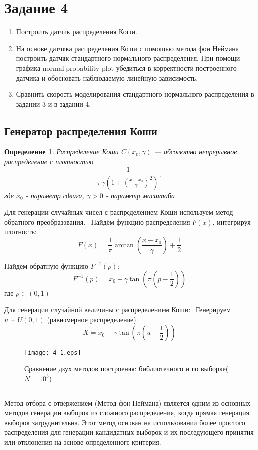 \documentclass[11pt]{article}
\newtheorem{definition}{Определение}[section]
\begin{document}
\section{Задание 4}


\begin{enumerate}
\item Построить датчик распределения Коши.
\item На основе датчика распределения Коши с помощью метода фон Неймана построить датчик стандартного нормального распределения. При помощи 
графика normal probability plot убедиться в корректности построенного датчика и обосновать наблюдаемую линейную зависимость.
\item Сравнить скорость моделирования стандартного нормального распределения в задании 3 и в задании 4.
\end{enumerate}

\subsection{Генератор распределения Коши}

\begin{definition}
Распределение Коши $C(x_0,\gamma)$ --- абсолютно непрерывное распределение с плотностью
$$
\dfrac{1}{\pi\gamma\left(1+(\frac{x-x_0}{\gamma})^2 \right)},
$$
где $x_0$ - параметр сдвига, $\gamma>0$ - параметр масштаба.
\end{definition}


Для генерации случайных чисел с распределением Коши используем метод обратного преобразования. \
Найдём функцию распределения $F(x)$, интегрируя плотность:
$$
    F(x) = \frac{1}{\pi}\arctan(\frac{x-x_0}{\gamma}) + \frac{1}{2}
$$

Найдём обратную функцию $F^{-1}(p)$:
$$
    F^{-1}(p) = x_0 + \gamma\tan(\pi(p-\frac{1}{2}))
$$
где $p \in (0,1)$

Для генерации случайной величины с распределением Коши: \
Генерируем $u \sim U(0,1)$ (равномерное распределение) 
$$
    X = x_0 + \gamma\tan(\pi(u-\frac{1}{2}))
$$


\begin{figure}[ht]
    \texttt{[image: 4\_1.eps]} 
    \caption{Сравнение двух методов построения: библиотечного и по выборке($N=10^3$)}
\end{figure} 
\FloatBarrier


\subsection{}
Метод отбора с отвержением (Метод фон Неймана) является одним из основных методов генерации выборок из сложного распределения, когда прямая генерация выборок затруднительна. Этот метод основан на использовании более простого распределения для генерации кандидатных выборок и их последующего принятия или отклонения на основе определенного критерия.
\end{document}
